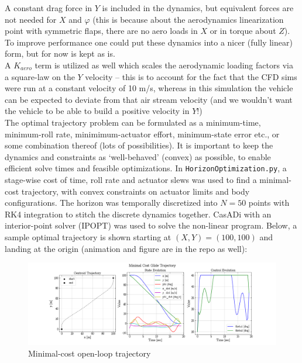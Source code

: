 \documentclass[12pt]{article}
\begin{document}
A constant drag force in $Y$ is included in the dynamics, but equivalent forces are not needed for $X$ and $\varphi$ (this is because about the aerodynamics linearization point with symmetric flaps, there are no aero loads in $X$ or in torque about $Z$).  To improve performance one could put these dynamics into a nicer (fully linear) form, but for now is kept as is. \\

A $K_{aero}$ term is utilized as well which scales the aerodynamic loading factors via a square-law on the $Y$ velocity -- this is to account for the fact that the CFD sims were run at a constant velocity of 10 m/s, whereas in this simulation the vehicle can be expected to deviate from that air stream velocity (and we wouldn't want the vehicle to be able to build a positive velocity in $Y$!) \\

The optimal trajectory problem can be formulated as a minimum-time, minimum-roll rate, minimimum-actuator effort, minimum-state error etc., or some combination thereof (lots of possibilities).  It is important to keep the dynamics and constraints as `well-behaved' (convex) as possible, to enable efficient solve times and feasible optimizations.  In \texttt{HorizonOptimization.py}, a stage-wise cost of time, roll rate and actuator slews was used to find a minimal-cost trajectory, with convex constraints on actuator limits and body configurations.  The horizon was temporally discretized into $N = 50$ points with RK4 integration to stitch the discrete dynamics together.  CasADi with an interior-point solver (IPOPT) was used to solve the non-linear program.  Below, a sample optimal trajectory is shown starting at $(X, Y) = (100, 100)$ and landing at the origin (animation and figure are in the repo as well):
\clearpage

\begin{figure}[h]
\centering
\includegraphics[width=1.0\linewidth]{../control_figures/minimal_cost_trajectory.png}
\caption{Minimal-cost open-loop trajectory}
\end{figure}
\end{document}

